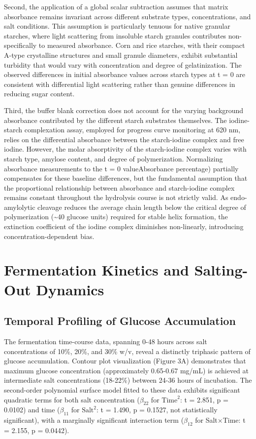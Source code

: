 \documentclass[
  12pt,
]{article}
\begin{document}
Second, the application of a global scalar subtraction assumes that
matrix absorbance remains invariant across different substrate types,
concentrations, and salt conditions. This assumption is particularly
tenuous for native granular starches, where light scattering from
insoluble starch granules contributes non-specifically to measured
absorbance. Corn and rice starches, with their compact A-type
crystalline structures and small granule diameters, exhibit substantial
turbidity that would vary with concentration and degree of
gelatinization. The observed differences in initial absorbance values
across starch types at t = 0 are consistent with differential light
scattering rather than genuine differences in reducing sugar content.

Third, the buffer blank correction does not account for the varying
background absorbance contributed by the different starch substrates
themselves. The iodine-starch complexation assay, employed for progress
curve monitoring at 620 nm, relies on the differential absorbance
between the starch-iodine complex and free iodine. However, the molar
absorptivity of the starch-iodine complex varies with starch type,
amylose content, and degree of polymerization. Normalizing absorbance
measurements to the t = 0 valueAbsorbance percentage) partially
compensates for these baseline differences, but the fundamental
assumption that the proportional relationship between absorbance and
starch-iodine complex remains constant throughout the hydrolysis course
is not strictly valid. As endo-amylolytic cleavage reduces the average
chain length below the critical degree of polymerization
(\textasciitilde40 glucose units) required for stable helix formation,
the extinction coefficient of the iodine complex diminishes
non-linearly, introducing concentration-dependent bias.

\section{Fermentation Kinetics and Salting-Out
Dynamics}\label{fermentation-kinetics-and-salting-out-dynamics}

\subsection{Temporal Profiling of Glucose
Accumulation}\label{temporal-profiling-of-glucose-accumulation}

The fermentation time-course data, spanning 0-48 hours across salt
concentrations of 10\%, 20\%, and 30\% w/v, reveal a distinctly
triphasic pattern of glucose accumulation. Contour plot visualization
(Figure 3A) demonstrates that maximum glucose concentration
(approximately 0.65-0.67 mg/mL) is achieved at intermediate salt
concentrations (18-22\%) between 24-36 hours of incubation. The
second-order polynomial surface model fitted to these data exhibits
significant quadratic terms for both salt concentration (\(\beta_{22}\)
for \(\text{Time}^2\): t = 2.851, p = 0.0102) and time (\(\beta_{11}\)
for \(\text{Salt}^2\): t = 1.490, p = 0.1527, not statistically
significant), with a marginally significant interaction term
(\(\beta_{12}\) for Salt×Time: t = 2.155, p = 0.0442).
\end{document}
